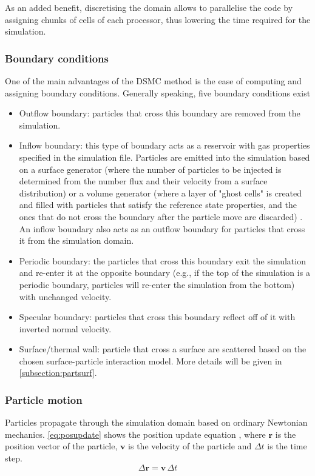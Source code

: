 As an added benefit, discretising the domain allows to parallelise the code by assigning chunks of cells of each processor, thus lowering the time required for the simulation.

\subsubsection{Boundary conditions}
One of the main advantages of the DSMC method is the ease of computing and assigning boundary conditions. Generally speaking, five boundary conditions exist \cite{natodsmc, spartadoc}
\begin{itemize}
    \item Outflow boundary: particles that cross this boundary are removed from the simulation.
    \item Inflow boundary: this type of boundary acts as a reservoir with gas properties specified in the simulation file. Particles are emitted into the simulation based on a surface generator (where the number of particles to be injected is determined from the number flux and their velocity from a surface distribution) or a volume generator (where a layer of "ghost cells" is created and filled with particles that satisfy the reference state properties, and the ones that do not cross the boundary after the particle move are discarded) \cite{natodsmc}. An inflow boundary also acts as an outflow boundary for particles that cross it from the simulation domain.
    \item Periodic boundary: the particles that cross this boundary exit the simulation and re-enter it at the opposite boundary (e.g., if the top of the simulation is a periodic boundary, particles will re-enter the simulation from the bottom) with unchanged velocity.
    \item Specular boundary: particles that cross this boundary reflect off of it with inverted normal velocity.
    \item Surface/thermal wall: particle that cross a surface are scattered based on the chosen surface-particle interaction model. More details will be given in \autoref{subsection:partsurf}.
\end{itemize}

\subsubsection{Particle motion}
\label{subsection:motion}
Particles propagate through the simulation domain based on ordinary Newtonian mechanics. \autoref{eq:posupdate} shows the position update equation \cite{bird}, where $\mathbf{r}$ is the position vector of the particle, $\mathbf{v}$ is the velocity of the particle and $\Delta{t}$ is the time step.
\begin{equation}
    \Delta{\mathbf{r}} = \mathbf{v}\, \Delta{t}
    \label{eq:posupdate}
\end{equation}

